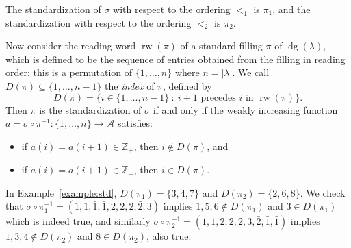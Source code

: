 \documentclass[ALCO,Unicode]{cedram}
\DeclareMathOperator{\dg}{dg}
\DeclareMathOperator{\rw}{rw}
\newcommand\cell[3]{
\def\i{#1} \def\j{#2} \def\entry{#3}

\draw (\j-1,-\i)--(\j,-\i)--(\j,-\i+1)--(\j-1,-\i+1)--(\j-1,-\i);
\node at (\j-.5,-\i+.5) {\entry};
}
\begin{document}
\begin{example}\label{example:std}
The standardization of $\sigma$ with respect to the ordering $<_1$ is $\pi_1$, and the standardization with respect to the ordering $<_2$ is $\pi_2$.
\begin{center}
\end{center}
\end{example}

Now consider the reading word $\rw(\pi)$ of a standard filling $\pi$ of $\dg(\lambda)$, which is defined to be the sequence of entries obtained from the filling in reading order: this is a permutation of $\{1,\ldots,n\}$ where $n=|\lambda|$. We call $D(\pi)\subseteq\{1,\ldots,n-1\}$ the \emph{index} of $\pi$, defined by
\[
D(\pi)=\big\{i \in \{1,\ldots,n-1\}\ :\ i+1 \text{ precedes } i \text{ in } \rw(\pi)\big\}.
\]
Then $\pi$ is the standardization of $\sigma$ if and only if the weakly increasing function $a=\sigma\circ \pi^{-1}:\{1,\ldots,n\}\rightarrow \mathcal{A}$ satisfies:
\begin{itemize}
\item if $a(i)=a(i+1)\in\mathbb{Z}_+$, then $i\not\in D(\pi)$, and
\item if $a(i)=a(i+1)\in\mathbb{Z}_-$, then $i\in D(\pi)$.
\end{itemize} 
\begin{example}
In Example~\ref{example:std}, $D(\pi_1)=\{3,4,7\}$ and $D(\pi_2)=\{2,6,8\}$. We check that $\sigma\circ\pi_1^{-1}=(1,1,\bar{1},\bar{1},2,2,2,\bar{2},3)$ implies $1,5,6 \not\in D(\pi_1)$ and $3\in D(\pi_1)$ which is indeed true, and similarly $\sigma\circ\pi_2^{-1}=(1,1,2,2,2,3,\bar{2},\bar{1},\bar{1})$ implies $1,3,4\not\in D(\pi_2)$ and $8\in D(\pi_2)$, also true. 
\end{example}
\end{document}
